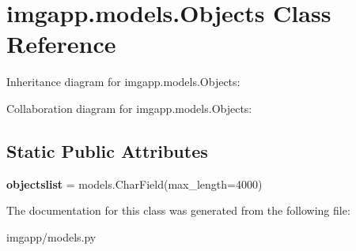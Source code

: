 \hypertarget{classimgapp_1_1models_1_1Objects}{}\section{imgapp.\+models.\+Objects Class Reference}
\label{classimgapp_1_1models_1_1Objects}


Inheritance diagram for imgapp.\+models.\+Objects\+:


Collaboration diagram for imgapp.\+models.\+Objects\+:
\subsection*{Static Public Attributes}
\begin{DoxyCompactItemize}
\item 
\mbox{\label{classimgapp_1_1models_1_1Objects_a28eeb66c1b9d9fa91997bf196652ae4d}} 
{\bfseries objectslist} = models.\+Char\+Field(max\+\_\+length=4000)
\end{DoxyCompactItemize}


The documentation for this class was generated from the following file\+:\begin{DoxyCompactItemize}
\item 
imgapp/models.\+py\end{DoxyCompactItemize}
